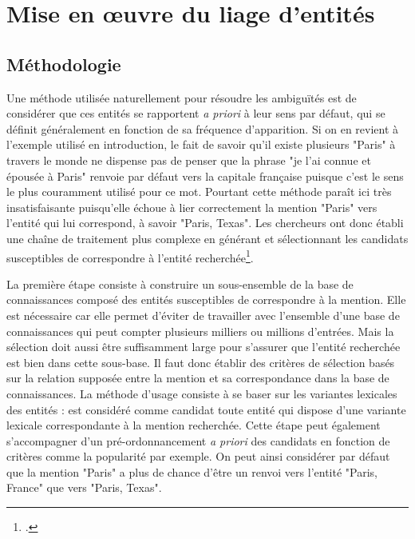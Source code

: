 \documentclass[a4paper,12pt,twoside]{book}
\begin{document}
	
	\section{Mise en œuvre du liage d'entités}
	
	\subsection{Méthodologie}
	
	Une méthode utilisée naturellement pour résoudre les ambiguïtés est de considérer que ces entités se rapportent \textit{a priori} à leur sens par défaut, qui se définit généralement en fonction de sa fréquence d'apparition. Si on en revient à l'exemple utilisé en introduction, le fait de savoir qu'il existe plusieurs "Paris" à travers le monde ne dispense pas de penser que la phrase "je l’ai connue et épousée à Paris" renvoie par défaut vers la capitale française puisque c'est le sens le plus couramment utilisé pour ce mot. Pourtant cette méthode paraît ici très insatisfaisante puisqu'elle échoue à lier correctement la mention "Paris" vers l'entité qui lui correspond, à savoir "Paris, Texas". Les chercheurs ont donc établi une chaîne de traitement plus complexe en générant et sélectionnant les candidats susceptibles de correspondre à l'entité recherchée\footcite[p. 117--125]{stern_identification_2013}.
	
	La première étape consiste à construire un sous-ensemble de la base de connaissances composé des entités susceptibles de correspondre à la mention. Elle est nécessaire car elle permet d'éviter de travailler avec l'ensemble d'une base de connaissances qui peut compter plusieurs milliers ou millions d'entrées. Mais la sélection doit aussi être suffisamment large pour s'assurer que l'entité recherchée est bien dans cette sous-base. Il faut donc établir des critères de sélection basés sur la relation supposée entre la mention et sa correspondance dans la base de connaissances. La méthode d'usage consiste à se baser sur les variantes lexicales des entités : est considéré comme candidat toute entité qui dispose d'une variante lexicale correspondante à la mention recherchée. Cette étape peut également s'accompagner d'un pré-ordonnancement \textit{a priori} des candidats en fonction de critères comme la popularité par exemple. On peut ainsi considérer par défaut que la mention "Paris" a plus de chance d'être un renvoi vers l'entité "Paris, France" que vers "Paris, Texas".
	
\end{document}
